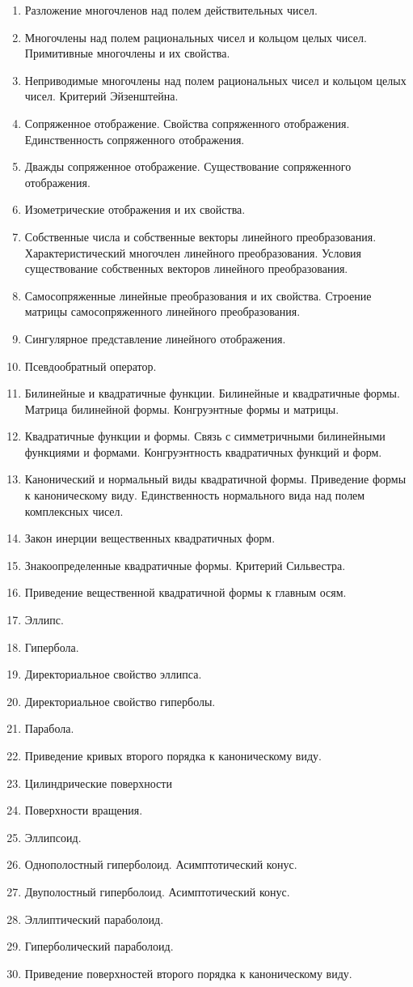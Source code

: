 \documentclass[a4paper]{article}
\begin{document}
\begin{enumerate}
\item Разложение многочленов над полем действительных чисел.
\item Многочлены над полем рациональных чисел и кольцом целых чисел. Примитивные многочлены и их свойства.
\item Неприводимые многочлены над полем рациональных чисел и кольцом целых чисел. Критерий Эйзенштейна.
\item Сопряженное отображение. Свойства сопряженного отображения. Единственность сопряженного отображения. 
\item Дважды сопряженное отображение. Существование сопряженного отображения.
\item Изометрические отображения и их свойства.
\item Собственные числа и собственные векторы линейного преобразования. Характеристический многочлен линейного преобразования. Условия существование собственных векторов линейного преобразования.
\item Самосопряженные линейные преобразования и их свойства. Строение матрицы самосопряженного линейного преобразования.
\item Сингулярное представление линейного отображения.
\item Псевдообратный оператор.
\item Билинейные и квадратичные функции. Билинейные и квадратичные формы. Матрица билинейной формы. Конгруэнтные формы и матрицы. 
\item Квадратичные функции и формы. Связь с симметричными билинейными функциями и формами. Конгруэнтность квадратичных функций и форм.
\item Канонический и нормальный виды квадратичной формы. Приведение формы к каноническому виду. Единственность нормального вида над полем комплексных чисел. 
\item Закон инерции вещественных квадратичных форм. 
\item Знакоопределенные квадратичные формы. Критерий Сильвестра. 
\item Приведение вещественной квадратичной формы к главным осям. 
\item Эллипс.
\item Гипербола.
\item Директориальное свойство эллипса.
\item Директориальное свойство гиперболы.
\item Парабола.
\item Приведение кривых второго порядка к каноническому виду.
\item Цилиндрические поверхности
\item Поверхности вращения.
\item Эллипсоид.
\item Однополостный гиперболоид. Асимптотический конус.
\item Двуполостный гиперболоид. Асимптотический конус.
\item Эллиптический параболоид.
\item Гиперболический параболоид.
\item Приведение поверхностей второго порядка к каноническому виду.
\end{enumerate}
\end{document}
